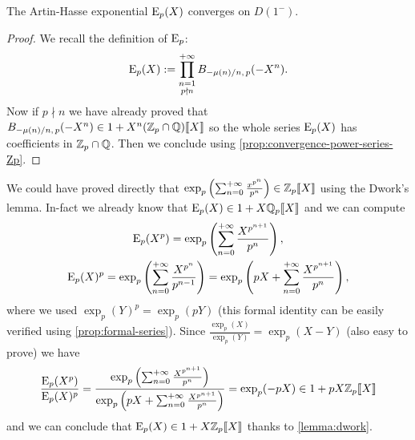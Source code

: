   		\begin{prop}
  			\label{prop:artin-hasse-convergence}
  			The Artin-Hasse exponential $\mathrm{E}_p(X)$ converges on $D(1^-)$.
  		\end{prop} 
  		\begin{proof}
  			We recall the definition of $\mathrm{E}_p$:
  			\[
  				\mathrm{E}_p(X) := \prod_{\substack{n=1 \\ p \nmid n}}^{+\infty} B_{-\mu(n)/n,\,p}(-X^n).
  			\]
  			Now if $p \nmid n$ we have already proved that $B_{-\mu(n)/n,\,p}(-X^n) \in 1 + X^n(\mathbb{Z}_p\cap\mathbb{Q})\llbracket X\rrbracket$ so the whole series $\mathrm{E}_p(X)$ has coefficients in $\mathbb{Z}_p\cap\mathbb{Q}$. Then we conclude using \cref{prop:convergence-power-series-Zp}.
  		\end{proof}
  		We could have proved directly that $\exp_p\left(\sum_{n=0}^{+\infty} \frac{x^{p^n}}{p^n}\right) \in \mathbb{Z}_p\llbracket X\rrbracket$ using the Dwork's lemma. In-fact
  		we already know that $\mathrm{E}_p(X) \in 1 + X\mathbb{Q}_p\llbracket {X} \rrbracket$ and we can compute
  		\begin{gather*}
  			\mathrm{E}_p(X^p) = \exp_p\left(\sum_{n=0}^{+\infty} \frac{X^{p^{n+1}}}{p^n}\right), \\
  			\mathrm{E}_p(X)^p = \exp_p\left(\sum_{n=0}^{+\infty} \frac{X^{p^n}}{p^{n-1}}\right) = \exp_p\left(pX + \sum_{n=0}^{+\infty} \frac{X^{p^{n+1}}}{p^n}\right),
  		\end{gather*}
  		where we used $\exp_p(Y)^p = \exp_p(pY)$ (this formal identity can be easily verified using \cref{prop:formal-series}). Since $\tfrac{\exp_p(X)}{\exp_p(Y)} = \exp_p(X - Y)$ (also easy to prove) we have
  		\[
  			\frac{\mathrm{E}_p(X^p)}{\mathrm{E}_p(X)^p} = \frac{\exp_p\left(\sum_{n=0}^{+\infty} \frac{X^{p^{n+1}}}{p^n}\right)}{\exp_p\left(pX + \sum_{n=0}^{+\infty} \frac{X^{p^{n+1}}}{p^n}\right)} = \exp_p(-pX) \in 1 + pX\mathbb{Z}_p\llbracket {X} \rrbracket
  		\]
  		and we can conclude that $\mathrm{E}_p(X) \in 1 + X\mathbb{Z}_p\llbracket {X} \rrbracket$ thanks to \cref{lemma:dwork}.